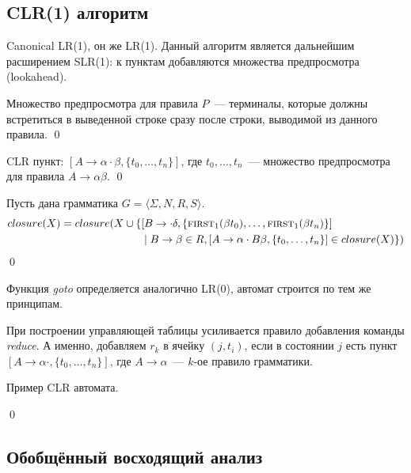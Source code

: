\subsection{CLR(1) алгоритм}

Canonical LR(1), он же LR(1).
Данный алгоритм является дальнейшим расширением SLR(1): к пунктам добавляются множества предпросмотра (lookahead).

\begin{definition}
Множество предпросмотра для правила $P$~--- терминалы, которые должны встретиться в выведенной строке сразу после строки, выводимой из данного правила.
\qed
\end{definition}

\begin{definition}
CLR пункт: $ [A \to \alpha \cdot \beta, \{ t_0, \dots, t_n\}] $,
где $t_0, \dots, t_n$~--- множество предпросмотра для правила $A \to \alpha \beta$.
\qed
\end{definition}


\begin{definition}
Пусть дана грамматика $G = \langle \Sigma, N, R, S\rangle$.
\begin{align*}
 closure(X) = closure(X \cup \{&[B \to \cdot \delta, \{\text{\textsc{first}}_{1}(\beta t_0), \dots, \text{\textsc{first}}_{1}(\beta t_n)\}] \\
                                &\mid B \to \beta \in R, [A \to \alpha \cdot B \beta, \{t_0, \dots, t_n\}] \in closure(X)\})
\end{align*}
\qed
\end{definition}

Функция \textit{goto} определяется аналогично LR(0), автомат строится по тем же принципам.

При построении управляющей таблицы усиливается правило добавления команды \textit{reduce}.
А именно, добавляем $r_k$ в ячейку $(j,t_i)$, если в состоянии $j$ есть пункт $[A \to \alpha \cdot, \{t_0, \dots, t_n\}]$, где $A \to \alpha$~--- $k$-ое правило грамматики.

\begin{example}
Пример CLR автомата.

\begin{center}
  
\end{center}
\qed
\end{example}
\subsection{Обобщённый восходящий анализ}

